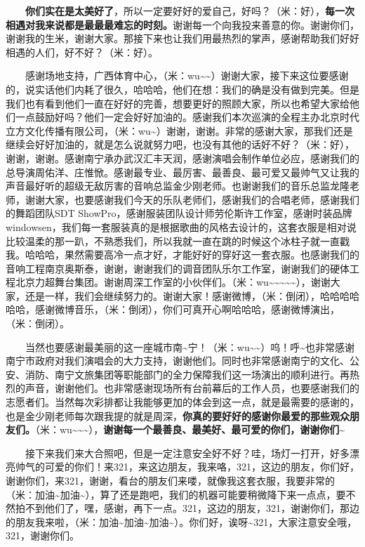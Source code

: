 \documentclass[]{ctexbook}
\begin{document}
  \textbf{你们实在是太美好了}，所以一定要好好的爱自己，好吗？（米：好），\textbf{每一次相遇对我来说都是最最最难忘的时刻。}谢谢每一个向我投来善意的你。谢谢你们，谢谢我的生米，谢谢大家。那接下来也让我们用最热烈的掌声，感谢帮助我们好好相遇的人们，好不好？（米：好）。

  感谢场地支持，广西体育中心，（米：wu\textasciitilde\textasciitilde）谢谢大家，接下来这位要感谢的，说实话他们内耗了很久，哈哈哈，他们在想：我们的确是没有做到完美。但是我们也有看到他们一直在好好的完善，想要更好的照顾大家，所以也希望大家给他们一点鼓励好吗？他们一定会好好加油的。感谢我们本次巡演的全程主办北京时代立方文化传播有限公司，（米：wu\textasciitilde）谢谢，谢谢。非常的感谢大家，那我们还是继续会好好加油的，就是怎么说就努力吧，也没有其他的话好不好？（米：好），谢谢，谢谢。感谢南宁承办武汉汇丰天润，感谢演唱会制作单位必应，感谢我们的总导演周佑洋、庄惟惞。感谢最专业、最厉害、最善良、最可爱又最帅气又让我的声音最好听的超级无敌厉害的音响总监金少刚老师。也谢谢我们的音乐总监龙隆老师，谢谢大家，也要感谢我们今天的乐队老师们，感谢我们的合唱老师，感谢我们的舞蹈团队SDT ShowPro，感谢服装团队设计师劳伦斯许工作室，感谢时装品牌windowsen，我们每一套服装真的是根据歌曲的风格去设计的，这套衣服是相对说比较温柔的那一趴，不熟悉我们，所以我就一直在跳的时候这个冰柱子就一直戳我。哈哈哈，果然需要高冷一点才好，才能好好的穿好这一套衣服。也感谢我们的音响工程南京奥斯泰，谢谢，谢谢我们的调音团队乐尔工作室，谢谢我们的硬体工程北京力超舞台集团。谢谢周深工作室的小伙伴们。（米：wu\textasciitilde\textasciitilde\textasciitilde\textasciitilde\textasciitilde），谢谢大家，还是一样，我们会继续努力的。谢谢大家！感谢微博，（米：倒闭），哈哈哈哈哈哈，感谢微博音乐，（米：倒闭），你们可真开心啊哈哈哈，感谢微博演出，（米：倒闭）。

  当然也要感谢最美丽的这一座城市南\textasciitilde 宁！（米：wu\textasciitilde\textasciitilde）呜！呼\textasciitilde 也非常感谢南宁市政府对我们演唱会的大力支持，谢谢他们。同时也非常感谢南宁的文化、公安、消防、南宁文旅集团等职能部门的全力保障我们这一场演出的顺利进行。再热烈的声音，谢谢他们。也非常感谢现场所有台前幕后的工作人员，也要感谢我们的志愿者们。当然每次彩排都让我能够更加的体会到这一点，就是最需要的感谢的，也是金少刚老师每次跟我提的就是周深，\textbf{你真的要好好的感谢你最爱的那些观众朋友们。}（米：wu\textasciitilde\textasciitilde\textasciitilde），\textbf{谢谢每一个最善良、最美好、最可爱的你们，谢谢你们\textasciitilde{}}

  接下来我们来大合照吧，但是一定注意安全好不好？哇，场灯一打开，好多漂亮帅气的可爱的你们！来321，来这边朋友，我来咯，321，这边的朋友，你们好，谢谢你们，来321，谢谢，看台的朋友们来喽，就像我这套衣服，我要非常的（米：加油\textasciitilde 加油\textasciitilde），算了还是跑吧，我们的机器可能要稍微降下来一点点，要不然拍不到他们了，嘿，感谢，再下一点。321，这边的朋友，321，谢谢你们，那边的朋友我来啦，（米：加油\textasciitilde 加油\textasciitilde 加油\textasciitilde）。你们好，诶呀\textasciitilde321，大家注意安全哦，321，谢谢你们。
\end{document}
